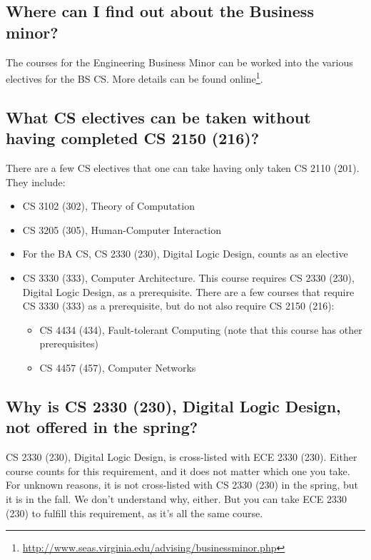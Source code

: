 \documentclass[10pt,letter]{book}
\newenvironment{itemlist}{
\begin{itemize}
\setlength{\itemsep}{0pt}
\setlength{\parskip}{0pt}}
{\end{itemize}}
\newcommand{\myurl}[1]{\footnote{\scriptsize\url{#1}}}
\begin{document}
\subsection{Where can I find out about the Business minor?}

The courses for the Engineering Business Minor can be worked into the
various electives for the BS CS. More details can be found
online\myurl{http://www.seas.virginia.edu/advising/businessminor.php}.


\subsection{What CS electives can be taken without having completed CS
  2150 (216)?}

There are a few CS electives that one can take having only taken CS
2110 (201).  They include:
\begin{itemlist}
\item CS 3102 (302), Theory of Computation
\item CS 3205 (305), Human-Computer Interaction
\item For the BA CS, CS 2330 (230), Digital Logic Design, counts as an
  elective
\item CS 3330 (333), Computer Architecture.  This course requires CS
  2330 (230), Digital Logic Design, as a prerequisite.  There are a
  few courses that require CS 3330 (333) as a prerequisite, but do not also
  require CS 2150 (216):
  \begin{itemlist}
  \item CS 4434 (434), Fault-tolerant Computing (note that this course
    has other prerequisites)
  \item CS 4457 (457), Computer Networks
  \end{itemlist}
\end{itemlist}

\subsection{Why is CS 2330 (230), Digital Logic Design, not offered
  in the spring?}
\label{cs2330}

CS 2330 (230), Digital Logic Design, is cross-listed with ECE 2330
(230).  Either course counts for this requirement, and it does not
matter which one you take.  For unknown reasons, it is not
cross-listed with CS 2330 (230) in the spring, but it is in the fall.
We don't understand why, either.  But you can take ECE 2330 (230) to
fulfill this requirement, as it's all the same course.
\end{document}

